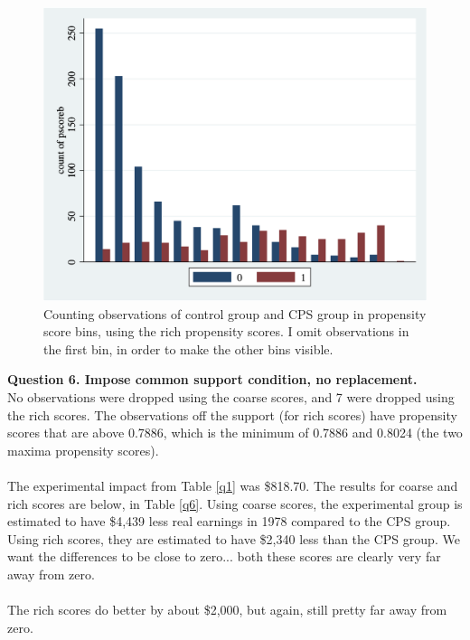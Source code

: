 \documentclass[12pt]{article}
\begin{document}
\begin{figure}
	\centering
	\includegraphics[scale = 0.2]{q4_pscoreb.png}
	\caption{Counting observations of control group and CPS group in propensity score bins, using the rich propensity scores. I omit observations in the first bin, in order to make the other bins visible. }
	\label{q5b}
\end{figure}

\newpage
\textbf{Question 6. Impose common support condition, no replacement.}\\
No observations were dropped using the coarse scores, and 7 were dropped using the rich scores. The observations off the support (for rich scores) have propensity scores that are above 0.7886, which is the minimum of 0.7886 and 0.8024 (the two maxima propensity scores). 
\\\\
The experimental impact from Table \ref{q1} was \$818.70. The results for coarse and rich scores are below, in Table \ref{q6}.  Using coarse scores, the experimental group is estimated to have \$4,439 less real earnings in 1978 compared to the CPS group. Using rich scores, they are estimated to have \$2,340 less than the CPS group. We want the differences to be close to zero... both these scores are clearly very far away from zero. 
\\\\
The rich scores do better by about \$2,000, but again, still pretty far away from zero. 

\end{document}

